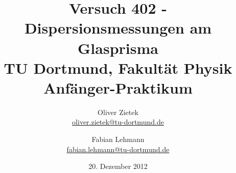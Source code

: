 

\renewcommand*\rmdefault{iwona}\normalfont\upshape


\title{Versuch 402 - Dispersionsmessungen am Glasprisma\\				%
\large TU Dortmund, Fakultät Physik\\ 
\normalsize Anfänger-Praktikum}

\author{Oliver Zietek\\			%
{\small \href{oliver.zietek@tu-dortmund.de}{oliver.zietek@tu-dortmund.de}}	%
\and						%
Fabian Lehmann\\					%
{\small \href{fabian.lehmann@tu-dortmund.de}{fabian.lehmann@tu-dortmund.de}}		%
}


\date{20. Dezember 2012}				%





\maketitle					%
\thispagestyle{empty} 				%



\tableofcontents


\newpage					%


